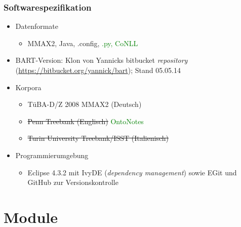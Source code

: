\documentclass[11pt,a4paper]{beamer}
\begin{document}
\begin{frame}
\frametitle{Softwarespezifikation}

\begin{itemize}

	\item Datenformate
		\begin{itemize}
		\item MMAX2, Java, .config, \textcolor{green}{.py, CoNLL}
	\end{itemize}
	\item BART-Version: Klon von Yannicks bitbucket \textit{repository} (\url{https://bitbucket.org/yannick/bart}); Stand 05.05.14 
	\item Korpora
	\begin{itemize}
		\item TüBA-D/Z 2008 MMAX2 (Deutsch)
		\item \sout{Penn Treebank (Englisch)} \textcolor{green}{OntoNotes}
		\item \sout{Turin University Treebank/ISST (Italienisch)}
	\end{itemize}
	\item Programmierumgebung
	\begin{itemize}
		\item Eclipse 4.3.2 mit IvyDE (\textit{dependency management}) sowie EGit und GitHub zur Versionskontrolle
	\end{itemize}

\end{itemize}

\end{frame}
\section{Module}
\end{document}
